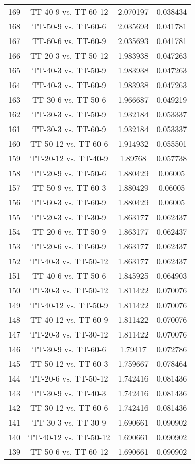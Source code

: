 \documentclass[a4paper,10pt]{article}
\begin{document}
\begin{landscape}
\begin{table}[!htp]
\begin{tabular}{cccc}
169&TT-40-9 vs. TT-60-12&2.070197&0.038434\\
168&TT-50-9 vs. TT-60-6&2.035693&0.041781\\
167&TT-60-6 vs. TT-60-9&2.035693&0.041781\\
166&TT-20-3 vs. TT-50-12&1.983938&0.047263\\
165&TT-40-3 vs. TT-50-9&1.983938&0.047263\\
164&TT-40-3 vs. TT-60-9&1.983938&0.047263\\
163&TT-30-6 vs. TT-50-6&1.966687&0.049219\\
162&TT-30-3 vs. TT-50-9&1.932184&0.053337\\
161&TT-30-3 vs. TT-60-9&1.932184&0.053337\\
160&TT-50-12 vs. TT-60-6&1.914932&0.055501\\
159&TT-20-12 vs. TT-40-9&1.89768&0.057738\\
158&TT-20-9 vs. TT-50-6&1.880429&0.06005\\
157&TT-50-9 vs. TT-60-3&1.880429&0.06005\\
156&TT-60-3 vs. TT-60-9&1.880429&0.06005\\
155&TT-20-3 vs. TT-30-9&1.863177&0.062437\\
154&TT-20-6 vs. TT-50-9&1.863177&0.062437\\
153&TT-20-6 vs. TT-60-9&1.863177&0.062437\\
152&TT-40-3 vs. TT-50-12&1.863177&0.062437\\
151&TT-40-6 vs. TT-50-6&1.845925&0.064903\\
150&TT-30-3 vs. TT-50-12&1.811422&0.070076\\
149&TT-40-12 vs. TT-50-9&1.811422&0.070076\\
148&TT-40-12 vs. TT-60-9&1.811422&0.070076\\
147&TT-20-3 vs. TT-30-12&1.811422&0.070076\\
146&TT-30-9 vs. TT-60-6&1.79417&0.072786\\
145&TT-50-12 vs. TT-60-3&1.759667&0.078464\\
144&TT-20-6 vs. TT-50-12&1.742416&0.081436\\
143&TT-30-9 vs. TT-40-3&1.742416&0.081436\\
142&TT-30-12 vs. TT-60-6&1.742416&0.081436\\
141&TT-30-3 vs. TT-30-9&1.690661&0.090902\\
140&TT-40-12 vs. TT-50-12&1.690661&0.090902\\
139&TT-50-6 vs. TT-60-12&1.690661&0.090902\\

\end{tabular}
\end{table}
\end{landscape}
\end{document}
